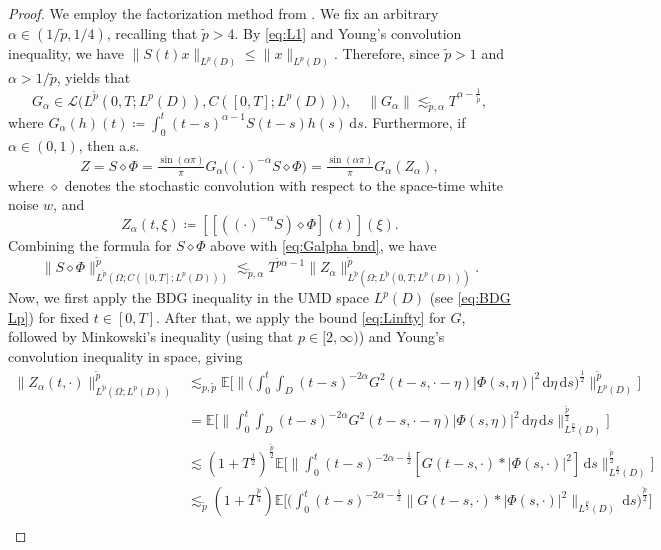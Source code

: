 \documentclass[10pt,a4paper]{amsart}
\numberwithin{equation}{section}
\newcommand{\ceqq}{\coloneqq}
\newcommand{\E}{{\mathbb E}}
\newcommand{\Om}{\Omega}
\newcommand{\calL}{\mathcal{L}}
\newcommand{\dd}{\,\mathrm{d}}
\begin{document}
\begin{proof}
We employ the factorization method from \cite{daprato}. We fix an arbitrary $\alpha\in(1/\tilde p, 1/4)$, recalling that $\tilde p>4$.  By \eqref{eq:L1} and Young's convolution inequality, we have 
$\|S(t)x\|_{L^p(D)}\leq \|x\|_{L^p(D)}.$  
Therefore, since ${\tilde p}>1$ and $\alpha>{1}/{\tilde p}$,   \cite[Prop.\ 5.9]{daprato}   
yields that 
\begin{equation}\label{eq:Galpha bnd}
G_\alpha\in \calL\big(L^{{\tilde p}}(0,T;L^p(D)),C([0,T];L^p(D))\big),\quad \|G_{\alpha}\|\lesssim_{\tilde p,\alpha}  T^{ \alpha-\frac{1}{\tilde p}},
\end{equation} 
where $G_\alpha(h)(t)\ceqq \int_0^t(t-s)^{\alpha-1}S(t-s)h(s)\dd s$. 
Furthermore, if $\alpha\in(0,1)$, then a.s.
\[
Z=S\diamond \Phi
=\tfrac{\sin(\alpha\pi)}{\pi} G_\alpha\big((\cdot)^{-\alpha}S\diamond \Phi\big)
=\tfrac{\sin(\alpha\pi)}{\pi} G_\alpha(Z_\alpha),
\]
where $\diamond$ denotes the stochastic convolution with respect to the space-time white noise $w$, and 
$$Z_\alpha(t,\xi)\ceqq [[((\cdot)^{-\alpha}S)\diamond \Phi](t)](\xi). $$ 
Combining  the formula for $S\diamond \Phi$ above with \eqref{eq:Galpha bnd}, we have 
\begin{equation}\label{eq:factor est}
\|S\diamond \Phi\|_{L^{\tilde p}(\Om;C([0,T];L^p(D)))}^{\tilde p}\lesssim_{\tilde p,\alpha}    T^{\tilde p \alpha-1}\|Z_\alpha\|_{L^{\tilde p}(\Om;L^{{\tilde p}}(0,T;L^p(D)))}^{\tilde p}. 
\end{equation}
Now, we first apply the BDG inequality  in the UMD space $L^p(D)$ (see \eqref{eq:BDG Lp}) for fixed $t\in[0,T]$. After that, we apply the bound \eqref{eq:Linfty} for $G$, followed by Minkowski's inequality (using that $p\in [2,\infty)$) and Young's convolution inequality in space, giving 
\begin{align*}
    \|Z_\alpha(t,\cdot)\|_{L^{\tilde p}(\Om;L^p(D))}^{\tilde p}
    &\lesssim_{p,\tilde p} \E\bigg[\Big\|\Big(\int_0^t\int_D (t-s)^{-2\alpha}G^2(t-s,\cdot-\eta)|\Phi(s,\eta)|^2\dd\eta\dd s \Big)^{\frac12}\Big\|_{L^p(D)}^{\tilde p} \bigg]\\
&= \E\bigg[\Big\| \int_0^t\int_D (t-s)^{-2\alpha}G^2(t-s,\cdot-\eta)|\Phi(s,\eta)|^2\dd\eta\dd s \Big\|_{L^{\frac{p}{2}}(D)}^{\frac{\tilde p}{2}} \bigg]\\
&\lesssim (1+T^{\frac12})^{\frac{\tilde p}{2}} \E\bigg[\Big\| \int_0^t (t-s)^{-2\alpha-\frac12}[G (t-s,\cdot)*|\Phi(s,\cdot)|^2] \dd s \Big\|_{L^{\frac{p}{2}}(D)}^{\frac{\tilde p}{2}} \bigg]\\
&\lesssim_{\tilde p} (1+T^{\frac{\tilde p}{4}}) \E\bigg[\Big(  \int_0^t (t-s)^{-2\alpha-\frac12}\big\|G (t-s,\cdot)*|\Phi(s,\cdot)|^2\big\|_{L^{\frac{p}{2}}(D)} \dd s \Big)^{\frac{\tilde p}{2}} \bigg]\\

\end{align*}
\end{proof}
\end{document}
